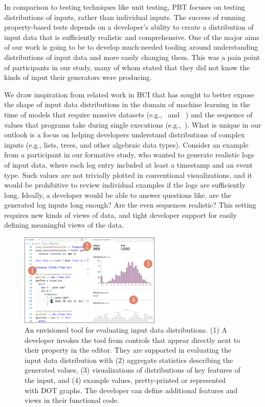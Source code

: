 %
In comparison to testing techniques like unit testing, PBT focuses on testing
distributions of inputs, rather than individual inputs. The success of running
property-based tests depends on a developer's ability to create a distribution
of input data that is sufficiently realistic and comprehensive. One of the major
aims of our work is going to be to develop much-needed tooling around
understanding distributions of input data and more easily changing them. This
was a pain point of participants in our study, many of whom stated that they did
not know the kinds of input their generators were producing.

We draw inspiration from related work in HCI that has sought to better expose
the shape of input data distributions in the domain of machine learning in the time of models
that require massive datasets (e.g.,~\cite{ref:hohman2019gamut} and
~\cite{ref:hohman2020understanding}) and the sequence of values that programs
take during single executions (e.g.,~\cite{ref:kang2017omnicode}). What is unique
in our outlook is a focus on helping developers understand distributions of
complex inputs (e.g., lists, trees, and other algebraic data types). Consider an
example from a participant in our formative study, who wanted to generate
realistic logs of input data, where each log entry included at least a timestamp
and an event type. Such values are not trivially plotted in conventional
visualizations, and it would be prohibitive to review individual examples if the
logs are sufficiently long. Ideally, a developer would be able to answer
questions like, are the generated log inputs long enough? Are the even sequences
realistic?  This setting requires new kinds of views of data, and tight
developer support for easily defining meaningful views of the data.

\begin{figure}
  \centering
  \includegraphics[width=0.6\textwidth]{assets/gen-vis.pdf}
  \caption{An envisioned tool for evaluating input data distributions.
  (1) A developer invokes the tool from controls that appear directly
  next to their property in the editor. They are supported in evaluating the
  input data distribution with (2) aggregate statistics describing the generated
  values, (3) visualizations of distributions of key features of the input, and (4)
  example values, pretty-printed or represented with DOT graphs. The developer can define additional
  features and views in their functional code.}\label{fig:gen-vis}
\end{figure}

